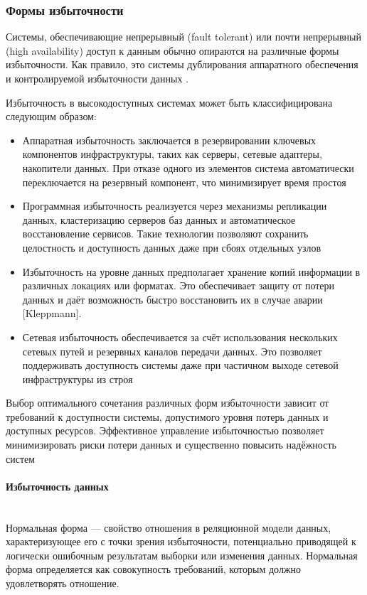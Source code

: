 \subsubsection{Формы избыточности}
Системы, обеспечивающие непрерывный (fault tolerant) или почти
непрерывный (high availability) доступ к данным обычно опираются на различные формы избыточности.
Как правило, это системы дублирования аппаратного обеспечения и контролируемой
избыточности данных \autocite{Baron}.

Избыточность в высокодоступных системах может быть классифицирована следующим образом:

\begin{itemize}
    \item Аппаратная избыточность заключается в резервировании ключевых компонентов инфраструктуры, таких как серверы, сетевые адаптеры, накопители данных. При отказе одного из элементов система автоматически переключается на резервный компонент, что минимизирует время простоя %
    \item Программная избыточность реализуется через механизмы репликации данных, кластеризацию серверов баз данных и автоматическое восстановление сервисов. Такие технологии позволяют сохранить целостность и доступность данных даже при сбоях отдельных узлов %
    \item Избыточность на уровне данных предполагает хранение копий информации в различных локациях или форматах. Это обеспечивает защиту от потери данных и даёт возможность быстро восстановить их в случае аварии [Kleppmann].
    \item Сетевая избыточность обеспечивается за счёт использования нескольких сетевых путей и резервных каналов передачи данных. Это позволяет поддерживать доступность системы даже при частичном выходе сетевой инфраструктуры из строя %
\end{itemize}
Выбор оптимального сочетания различных форм избыточности зависит от требований к доступности системы, допустимого уровня потерь данных и доступных ресурсов. Эффективное управление избыточностью позволяет минимизировать риски потери данных и существенно повысить надёжность систем %

\paragraph{Избыточность данных} ~\\
Нормальная форма — свойство отношения в реляционной модели данных, характеризующее его с точки зрения избыточности, потенциально приводящей к логически ошибочным результатам выборки или изменения данных. Нормальная форма определяется как совокупность требований, которым должно удовлетворять отношение.


